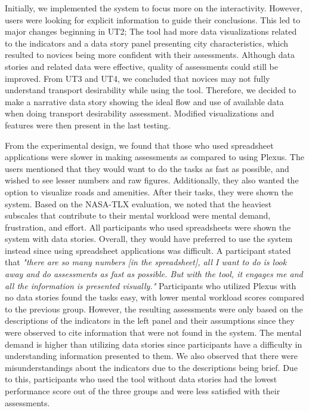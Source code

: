 \documentclass{sigchi}
\begin{document}

Initially, we implemented the system to focus more on the interactivity. However, users were looking for explicit information to guide their conclusions. This led to major changes beginning in UT2; The tool had more data visualizations related to the indicators and a data story panel presenting city characteristics, which resulted to novices being more confident with their assessments. Although data stories and related data were effective, quality of assessments could still be improved. From UT3 and UT4, we concluded that novices may not fully understand transport desirability while using the tool. Therefore, we decided to make a narrative data story showing the ideal flow and use of available data when doing transport desirability assessment. Modified visualizations and features were then present in the last testing.

From the experimental design, we found that those who used spreadsheet applications were slower in making assessments as compared to using Plexus. The users mentioned that they would want to do the tasks as fast as possible, and wished to see lesser numbers and raw figures. Additionally, they also wanted the option to visualize roads and amenities. After their tasks, they were shown the system. Based on the NASA-TLX evaluation, we noted that the heaviest subscales that contribute to their mental workload were mental demand, frustration, and effort. All participants who used spreadsheets were shown the system with data stories. Overall, they would have preferred to use the system instead since using spreadsheet applications was difficult. A participant stated that \textit{"there are so many numbers [in the spreadsheet], all I want to do is look away and do assessments as fast as possible. But with the tool, it engages me and all the information is presented visually."} Participants who utilized Plexus with no data stories found the tasks easy, with lower mental workload scores compared to the previous group. However, the resulting assessments were only based on the descriptions of the indicators in the left panel and their assumptions since they were observed to cite information that were not found in the system. The mental demand is higher than utilizing data stories since participants have a difficulty in understanding information presented to them.  We also observed that there were misunderstandings about the indicators due to the descriptions being brief. Due to this, participants who used the tool without data stories had the lowest performance score out of the three groups and were less satisfied with their assessments. 
\end{document}
